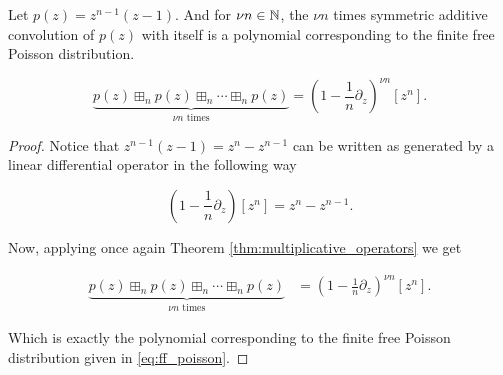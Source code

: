 \begin{theorem}
    Let $p(z) = z^{n-1}(z-1)$. And for $\nu n \in \mathbb N$, the $\nu n$ times symmetric additive convolution of $p(z)$ with itself is a polynomial corresponding to the finite free Poisson distribution.

    \begin{equation*}
        \underbrace{p(z) \boxplus_n p(z) \boxplus_n \cdots \boxplus_n p(z)}_\text{$\nu n$ times} = \left(1-\frac1n \partial_z \right)^{\nu n}[z^n].%
    \end{equation*}
\end{theorem}

\begin{proof}
    Notice that $z^{n-1}(z-1) = z^n - z^{n-1}$ can be written as generated by a linear differential operator in the following way

    \begin{equation*}
        \left(1 - \frac1n \partial_z\right)[z^n] = z^n - z^{n-1}.
    \end{equation*}

    Now, applying once again Theorem \ref{thm:multiplicative_operators} we get

    \begin{align*}
        \underbrace{p(z) \boxplus_n p(z) \boxplus_n \cdots \boxplus_n p(z)}_\text{$\nu n$ times} &= \left(1-\frac1n \partial_z \right)^{\nu n}[z^n].
    \end{align*}

    Which is exactly the polynomial corresponding to the finite free Poisson distribution given in  \eqref{eq:ff_poisson}.
\end{proof}